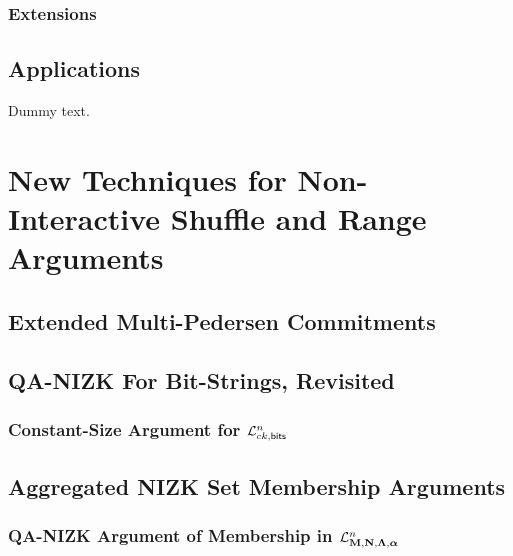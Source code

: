             

        \subsection{Extensions}

            

    \section{Applications}

    Dummy text.

\chapter{New Techniques for Non-Interactive Shuffle and Range Arguments}

    

    \section{Extended Multi-Pedersen Commitments}

        

    \section{QA-NIZK For Bit-Strings, Revisited}

        

        \subsection{Constant-Size Argument for $\mathcal{L}_{ck,\mathsf{bits}}^n$}

            


    \section{Aggregated NIZK Set Membership Arguments}

        

        \subsection{QA-NIZK Argument of Membership in $\mathcal{L}_{\mathbf{{M}},\mathbf{{N}},\mathbf{{\Lambda}},{\boldsymbol \alpha}}^n$} \label{sec:bin-lan-constr}

